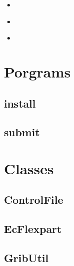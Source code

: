 \documentclass[letterpaper,10pt,english]{sphinxmanual}
\begin{document}
\begin{sphinxShadowBox}
\begin{itemize}
\begin{itemize}
\item {} 
\label{\detokenize{api:id12}}{\hyperref[\detokenize{api:prepare-flexpart}]{}}

\item {} 
\label{\detokenize{api:id13}}{\hyperref[\detokenize{api:tools}]{}}

\item {} 
\label{\detokenize{api:id14}}{\hyperref[\detokenize{api:module-disaggregation}]{}}

\end{itemize}

\end{itemize}
\end{sphinxShadowBox}


\section{Porgrams}
\label{\detokenize{api:porgrams}}

\subsection{install}
\label{\detokenize{api:install}}

\subsection{submit}
\label{\detokenize{api:submit}}

\section{Classes}
\label{\detokenize{api:classes}}

\subsection{ControlFile}
\label{\detokenize{api:controlfile}}

\subsection{EcFlexpart}
\label{\detokenize{api:ecflexpart}}

\subsection{GribUtil}
\label{\detokenize{api:gributil}}
\end{document}
